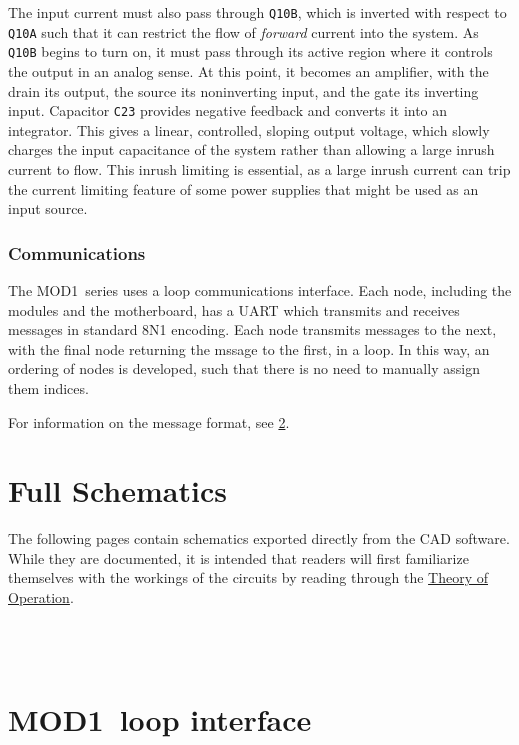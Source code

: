 \documentclass[letterpaper,twocolumn,10pt,openany,oneside,final,fleqn]{memoir}
\newcommand{\Series}{MOD1\ }
\newcommand{\rd}[1]{\texttt{#1}}
\begin{document}
The input current must also pass through \rd{Q10B}, which is inverted with respect
to \rd{Q10A} such that it can restrict the flow of \emph{forward} current into the
system. As \rd{Q10B} begins to turn on, it must pass through its active region where
it controls the output in an analog sense. At this point, it becomes an amplifier,
with the drain its output, the source its noninverting input, and the gate its
inverting input. Capacitor \rd{C23} provides negative feedback and converts it into
an integrator. This gives a linear, controlled, sloping output voltage, which
slowly charges the input capacitance of the system rather than allowing a large
inrush current to flow. This inrush limiting is essential, as a large inrush current
can trip the current limiting feature of some power supplies that might be used
as an input source.

\subsection{Communications}

The \Series series uses a loop communications interface. Each node, including the modules
and the motherboard, has a UART which transmits and receives messages in standard
8N1 encoding. Each node transmits messages to the next, with the final node returning
the mssage to the first, in a loop. In this way, an ordering of nodes is developed, such
that there is no need to manually assign them indices.

For information on the message format, see \cref{app:loopif}.



\appendix
\chapter{Full Schematics}
The following pages contain schematics exported directly from the CAD software.
While they are documented, it is intended that readers will first familiarize
themselves with the workings of the circuits by reading through the
\hyperref[chap:too]{Theory of Operation}.

\newpage
\ \\
\newpage
\ \\




\newpage
\chapter{\Series loop interface}
\label{app:loopif}
\end{document}
